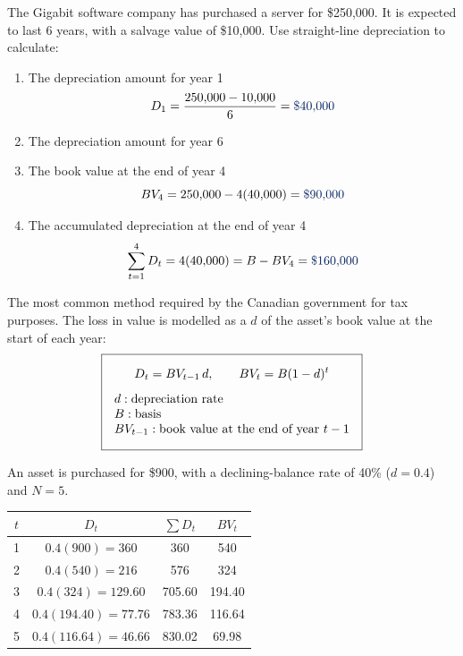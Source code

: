 \begin{example}
    The Gigabit software company has purchased a server for \$250,000. It
    is expected to last 6 years, with a salvage value of \$10,000. Use
    straight-line depreciation to calculate:
    \begin{enumerate}[label = \roman*.]
        \item The depreciation amount for year 1
        \[D_1 = \frac{250{,}000 - 10{,}000}{6} = \db{\$40{,}000}\]
        \item The depreciation amount for year 6
        \\
        \item The book value at the end of year 4
        \[BV_4 = 250{,}000 - 4(40{,}000) = \db{\$90{,}000}\]
        \item The accumulated depreciation at the end of year 4
        \[\sum_{t=1}^{4} D_t = 4(40{,}000) = B - BV_4 = \db{\$160{,}000}\]
    \end{enumerate}
\end{example}

\begin{definition}
    The most common method required by the Canadian government for tax
    purposes. The loss in value is modelled as a 
    $d$ of the asset's book value at the start of each year:
    \[\boxed{\begin{gathered}
        D_t = BV_{t-1}\,d, \qquad BV_t = B(1 - d)^t\\[4pt]
        \begin{array}{@{}l@{}}
            d: \text{depreciation rate}\\
            B: \text{basis}\\
            BV_{t-1}: \text{book value at the end of year } t-1
        \end{array}
    \end{gathered}}\]
\end{definition}

\begin{example}
    An asset is purchased for \$900, with a declining-balance rate of 40\%
    ($d = 0.4$) and $N = 5$.
    \begin{center}
    \begin{tabular}{cccc}
        \toprule
        $t$ & $D_t$ & $\sum D_t$ & $BV_t$ \\
        \midrule
        1 & $0.4(900) = 360$ & 360 & 540 \\
        2 & $0.4(540) = 216$ & 576 & 324 \\
        3 & $0.4(324) = 129.60$ & 705.60 & 194.40 \\
        4 & $0.4(194.40) = 77.76$ & 783.36 & 116.64 \\
        5 & $0.4(116.64) = 46.66$ & 830.02 & 69.98 \\
        \bottomrule
    \end{tabular}
    \end{center}
\end{example}

